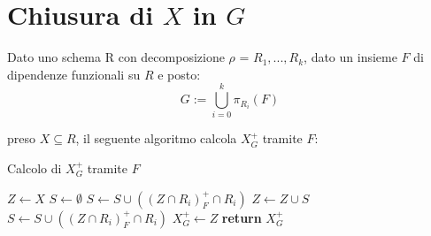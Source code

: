 \documentclass{article}
\begin{document}
\section{Chiusura di $X$ in $G$}
Dato uno schema R con decomposizione $\rho$ = $R_1,...,R_k$, dato un insieme $F$ di dipendenze funzionali su $R$ e posto:
\[ G := \bigcup_{i=0}^{k} \pi_{R_i}(F) \]\par
preso $X \subseteq R$, il seguente algoritmo calcola $X_G^+$ tramite $F$:
\begin{algorithm}
  \caption{Calcolo di $X_G^+$ tramite $F$}
  \begin{algorithmic}[1]
          \State $Z \gets X$
          \State $S \gets \emptyset$
              \State $S \gets S \cup ((Z \cap R_i)^+_F \cap R_i)$
          \EndFor
              \State $Z \gets Z \cup S$
                  \State $S \gets S \cup ((Z \cap R_i)^+_F \cap R_i)$
              \EndFor
          \EndWhile
          \State $X_G^+ \gets Z$
          \State \textbf{return} $X_G^+$
      \EndProcedure
  \end{algorithmic}
\end{algorithm}
\end{document}
